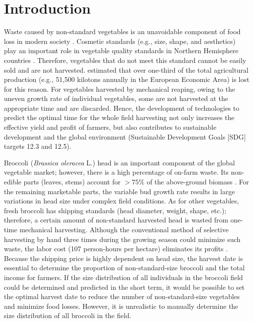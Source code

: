 \section{Introduction}

Waste caused by non-standard vegetables is an unavoidable component of food loss in modern society \citep{parfitt_food_2010,teuber_food_2016}. Cosmetic standards (e.g., size, shape, and aesthetics) play an important role in vegetable quality standards in Northern Hemisphere countries \citep{porter_avoidable_2018}. Therefore, vegetables that do not meet this standard cannot be easily sold and are not harvested\citet{garrone_opening_2014}. \citet{porter_avoidable_2018} estimated that over one-third of the total agricultural production (e.g., 51,500 kilotons annually in the European Economic Area) is lost for this reason. For vegetables harvested by mechanical reaping, owing to the uneven growth rate of individual vegetables, some are not harvested at the appropriate time and are discarded. Hence, the development of technologies to predict the optimal time for the whole field harvesting not only increases the effective yield and profit of farmers, but also contributes to sustainable development and the global environment (Sustainable Development Goals [SDG] targets 12.3 and 12.5).

Broccoli (\textit{Brassica oleracea} L.) head is an important component of the global vegetable market; however, there is a high percentage of on-farm waste. Its non-edible parts (leaves, stems) account for $> 75\%$ of the above-ground biomass \citep[Table~1]{fink_nitrogen_1999}. For the remaining marketable parts, the variable bud growth rate results in large variations in head size under complex field conditions. As for other vegetables, fresh broccoli has shipping standards (head diameter, weight, shape, etc.); therefore, a certain amount of non-standard harvested head is wasted from one-time mechanical harvesting. Although the conventional method of selective harvesting by hand three times during the growing season could minimize such waste, the labor cost (107 person-hours per hectare) eliminates its profits \citep{blok_effect_2021}. Because the shipping price is highly dependent on head size, the harvest date is essential to determine the proportion of non-standard-size broccoli and the total income for farmers. If the size distribution of all individuals in the broccoli field could be determined and predicted in the short term, it would be possible to set the optimal harvest date to reduce the number of non-standard-size vegetables and minimize food losses. However, it is unrealistic to manually determine the size distribution of all broccoli in the field.

